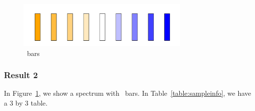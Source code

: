 \begin{figure}[H]
  \centering
  \includegraphics[width=0.75\textwidth]{figures/fig1.png}
  \vspace{-.5em}
  \caption{\nbars~bars}
  \label{fig:fig1}
\end{figure}

\subsubsection{Result 2}

In Figure~\ref{fig:fig1}, we show a spectrum with \nbars~bars.
In Table~\ref{table:sampleinfo}, we have a 3 by 3 table.
